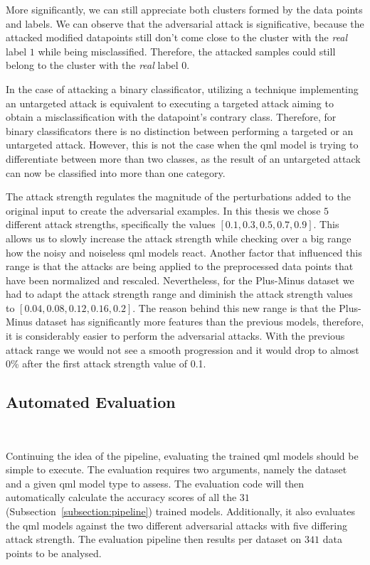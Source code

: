 More significantly, we can still appreciate both clusters
formed by the data points and labels. We can observe that
the adversarial attack is significative, because the attacked
modified datapoints still don't come close to the cluster
with the \textit{real} label \(1\) while being misclassified.
Therefore, the attacked samples could still belong to the
cluster with the \textit{real} label \(0\). \

In the case of attacking a binary classificator, utilizing
a technique implementing an untargeted attack is equivalent
to executing a targeted attack aiming to obtain a misclassification
with the datapoint's contrary class. Therefore, for binary
classificators there is no distinction between performing a
targeted or an untargeted attack. However, this is not the case when
the \ac{qml} model is trying to differentiate between more than
two classes, as the result of an untargeted attack can now
be classified into more than one category. \

The attack strength regulates the magnitude of the perturbations
added to the original input to create the adversarial examples. 
In this thesis we chose \(5\) different attack strengths,
specifically the values \(\left[0.1, 0.3, 0.5, 0.7, 0.9\right]\).
This allows us to slowly increase the attack strength while
checking over a big range how the noisy and noiseless \ac{qml}
models react. Another factor that influenced this range is that
the attacks are being applied to the preprocessed data points
that have been normalized and rescaled. Nevertheless,
for the Plus-Minus dataset we had to adapt the attack
strength range and diminish the attack strength values to
\(\left[0.04, 0.08, 0.12, 0.16, 0.2\right]\).
The reason behind this new range is that the Plus-Minus
dataset has significantly more features than the previous
models, therefore, it is considerably easier to perform
the adversarial attacks. With the previous attack range
we would not see a smooth progression and it would drop to
almost 0\% after the first attack strength value of 0.1. \

\subsection{Automated Evaluation}\label{subsection:evaluation} \

Continuing the idea of the pipeline, evaluating the trained
\ac{qml} models should be simple to execute. The evaluation
requires two arguments, namely the dataset and a given \ac{qml}
model type to assess. The evaluation code will then
automatically calculate the accuracy scores of all the \(31\)
(Subsection~\ref{subsection:pipeline}) trained models. Additionally,
it also evaluates the \ac{qml} models against the two different
adversarial attacks with five differing attack strength.
The evaluation pipeline then results per dataset on \(341\)
data points to be analysed. \

